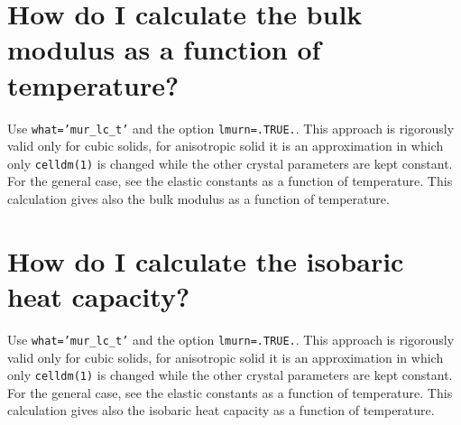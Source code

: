 \documentclass[12pt,a4paper,twoside]{report}
\begin{document}
\newpage
{\color{coral}\section{How do I calculate the bulk modulus as a function of 
temperature?}}
\color{black}
Use \texttt{what='mur\_lc\_t'} and the option \texttt{lmurn=.TRUE.}.
This approach is rigorously valid only for cubic solids, for anisotropic
solid it is an approximation in which only \texttt{celldm(1)} is
changed while the other crystal parameters are kept constant. 
For the general case, see the elastic constants as a function of 
temperature. This calculation gives also the bulk modulus as a function 
of temperature.

\newpage
{\color{coral}\section{How do I calculate the isobaric heat capacity?}}
\color{black}
Use \texttt{what='mur\_lc\_t'} and the option \texttt{lmurn=.TRUE.}.
This approach is rigorously valid only for cubic solids, for anisotropic
solid it is an approximation in which only \texttt{celldm(1)} is
changed while the other crystal parameters are kept constant.
For the general case, see the elastic constants
as a function of temperature. This calculation gives also the 
isobaric heat capacity as a function of temperature.
\end{document}
